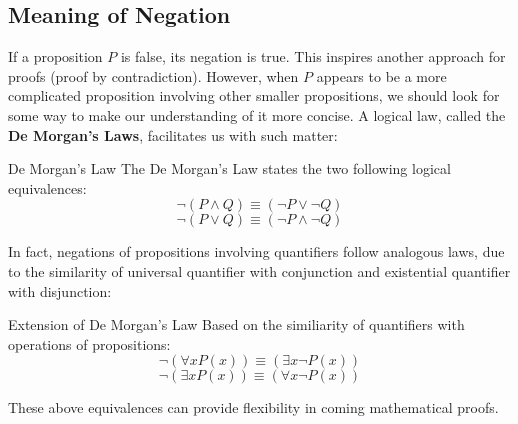 \subsection{Meaning of Negation}
If a proposition $P$ is false, its negation is true. This inspires another approach for proofs (proof by contradiction). However, when $P$ appears to be a more complicated proposition involving other smaller propositions, we should look for some way to make our understanding of it more concise. A logical law, called the \textbf{De Morgan's Laws}, facilitates us with such matter:
\begin{ln-axiom}{De Morgan's Law}{}
    The De Morgan's Law states the two following logical equivalences:
    \[\neg (P \land Q) \equiv (\neg P \lor \neg Q)\]
    \[\neg (P \lor Q) \equiv (\neg P \land \neg Q)\]
\end{ln-axiom}
In fact, negations of propositions involving quantifiers follow analogous laws, due to the similarity of universal quantifier with conjunction and existential quantifier with disjunction:
\begin{ln-axiom}{Extension of De Morgan's Law}{}
    Based on the similiarity of quantifiers with operations of propositions:
    \[\neg (\forall x P(x)) \equiv (\exists x \neg P(x))\]
    \[\neg (\exists x P(x)) \equiv (\forall x \neg P(x))\]
\end{ln-axiom}
These above equivalences can provide flexibility in coming mathematical proofs.

